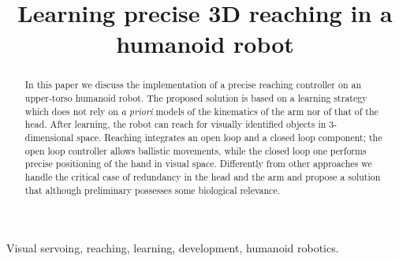\documentclass[conference,letterpaper]{IEEEtran}
\begin{document}
\title{\huge Learning precise 3D reaching in a humanoid robot}

\author{
\and
{}
}

\maketitle
\begin{abstract}
In this paper we discuss the implementation of a precise reaching controller 
on an upper-torso humanoid robot. The proposed solution is based on a 
learning strategy which does not rely on \emph{a priori} models of the 
kinematics of the arm nor of that of the head. After learning, the robot 
can reach for visually identified objects in 3-dimensional space. Reaching 
integrates an open loop and a closed loop component; the open loop controller allows 
ballistic movements, while the closed loop one performs precise positioning of 
the hand in visual space. Differently from other approaches we handle 
the critical case of redundancy in the head and the arm and propose a 
solution that although preliminary possesses some biological relevance.
\end{abstract}

\begin{keywords}
Visual servoing, reaching, learning, development, humanoid robotics.
\end{keywords}
%








%



\end{document}
